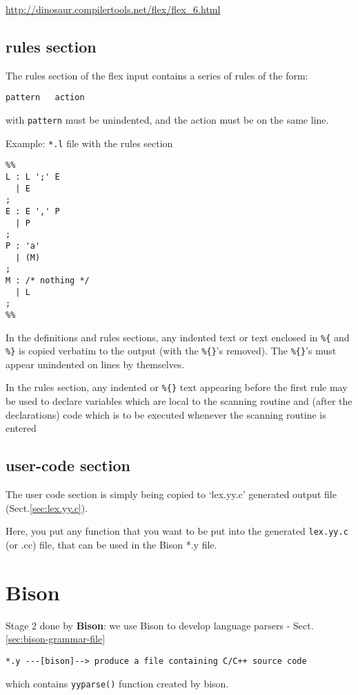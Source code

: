 \url{http://dinosaur.compilertools.net/flex/flex_6.html}

\subsection{rules section}
\label{sec:flex_grammar-rules-section}

 The rules section of the flex input contains a series of rules of the form:
\begin{verbatim}
pattern   action
\end{verbatim}
with \verb!pattern! must be unindented, and the action must be on the same line.

Example: \verb!*.l! file with the rules section
\begin{verbatim}
%%
L : L ';' E
  | E
;
E : E ',' P
  | P
;
P : 'a'
  | (M)
;
M : /* nothing */
  | L
;
%%
\end{verbatim}

In the definitions and rules sections, any indented text or text enclosed in
\verb!%{! and \verb!%}! is copied verbatim to the output (with the \verb!%{}!'s
removed). The \verb!%{}!'s must appear unindented on lines by themselves.


In the rules section, any indented or \verb!%{}! text appearing before the first
rule may be used to declare variables which are local to the scanning routine
and (after the declarations) code which is to be executed whenever the scanning
routine is entered

\subsection{user-code section}
\label{sec:flex_grammar-user-code-section}

The user code section is simply being copied to `lex.yy.c' generated output
file (Sect.\ref{sec:lex.yy.c}).

Here, you put any function that you want to be put into the generated
\verb!lex.yy.c! (or .cc) file, that can be used in the Bison *.y file.




\section{Bison}
\label{sec:bison}

Stage 2 done by {\bf Bison}: we use Bison to develop language parsers -
  Sect.\ref{sec:bison-grammar-file}


\begin{verbatim}
*.y ---[bison]--> produce a file containing C/C++ source code
\end{verbatim}  
which contains \verb!yyparse()! function created by bison.

